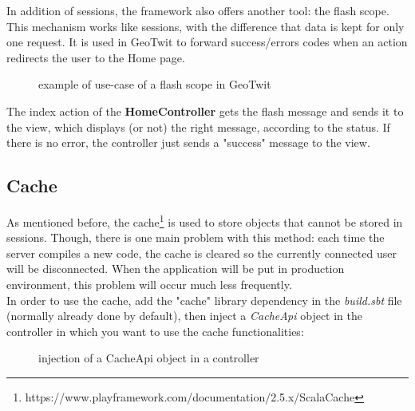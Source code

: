 \documentclass[a4paper,11pt]{report}
\begin{document}
In addition of sessions, the framework also offers another tool: the flash scope. This mechanism works like sessions, with the difference that data is kept for only one request. It is used in GeoTwit to forward success/errors codes when an action redirects the user to the Home page.
\begin{figure}[H]
\vspace{-5pt}
\begin{center}
\vspace{-20pt}
\caption{example of use-case of a flash scope in GeoTwit}
\end{center}
\end{figure}
\vspace{-10pt}

The index action of the \textbf{HomeController} gets the flash message and sends it to the view, which displays (or not) the right message, according to the status. If there is no error, the controller just sends a "success" message to the view.

\subsection{Cache}
\label{cache}
As mentioned before, the cache\footnote{https://www.playframework.com/documentation/2.5.x/ScalaCache} is used to store objects that cannot be stored in sessions. Though, there is one main problem with this method: each time the server compiles a new code, the cache is cleared so the currently connected user will be disconnected. When the application will be put in production environment, this problem will occur much less frequently.\\

In order to use the cache, add the "cache" library dependency in the \emph{build.sbt} file (normally already done by default), then inject a \emph{CacheApi} object in the controller in which you want to use the cache functionalities:
\begin{figure}[H]
\vspace{-5pt}
\begin{center}
\vspace{-20pt}
\caption{injection of a CacheApi object in a controller}
\end{center}
\end{figure}
\vspace{-10pt}
\end{document}
